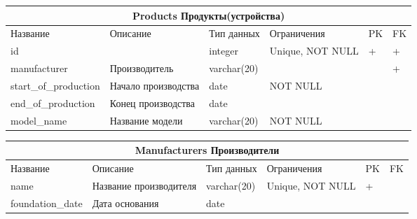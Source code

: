 \documentclass{article}
\begin{document}
\begin{tabular}{ |p{3.5cm}|p{3cm}|p{3cm}|p{3cm}|p{2cm}|p{2cm}|  }
\hline
\multicolumn{6}{|c|}{Products Продукты(устройства)} \\
\hline
Название & Описание & Тип данных & Ограничения & PK & FK\\
\hline
id                     &   %
                       &   %
integer                &   %
Unique, NOT NULL       &   %
 +                     &   %
 +                     \\  %
\hline
manufacturer           &   %
Производитель          &   %
varchar(20)            &   %
                       &   %
                       &   %
 +                     \\  %
\hline
start\_of\_production  &   %
Начало производства    &   %
date                   &   %
NOT NULL               &   %
                       &   %
                       \\  %
\hline
end\_of\_production    &   %
Конец производства     &   %
date                   &   %
                       &   %
                       &   %
                       \\  %
\hline
model\_name            &   %
Название модели        &   %
varchar(20)            &   %
NOT NULL               &   %
                       &   %
                       \\  %
\hline
\end{tabular}

\begin{tabular}{ |p{3.5cm}|p{3cm}|p{3cm}|p{3cm}|p{2cm}|p{2cm}| }
\hline
\multicolumn{6}{|c|}{Manufacturers Производители} \\
\hline
Название & Описание & Тип данных & Ограничения & PK & FK\\
\hline
name                   &   %
Название производителя &   %
varchar(20)            &   %
Unique, NOT NULL       &   %
 +                     &   %
                       \\  %
\hline
foundation\_date       &   %
Дата основания         &   %
date                   &   %
                       &   %
                       &   %
                       \\  %
\hline
\end{tabular}
\end{document}
